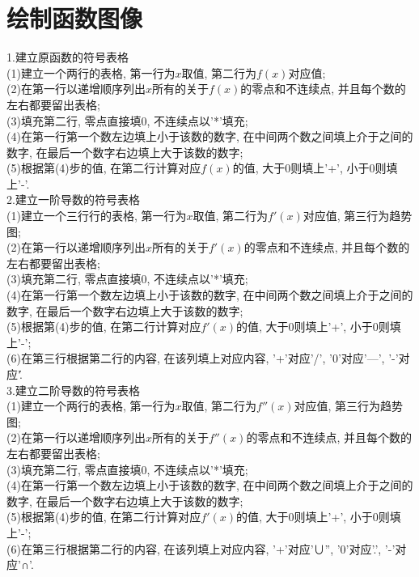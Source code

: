 \chapter{绘制函数图像}
1.建立原函数的符号表格\\
(1)建立一个两行的表格, 第一行为$x$取值, 第二行为$f(x)$对应值;\\
(2)在第一行以递增顺序列出$x$所有的关于$f(x)$的零点和不连续点, 并且每个数的左右都要留出表格;\\
(3)填充第二行, 零点直接填0, 不连续点以'*'填充;\\
(4)在第一行第一个数左边填上小于该数的数字, 在中间两个数之间填上介于之间的数字, 在最后一个数字右边填上大于该数的数字;\\
(5)根据第(4)步的值, 在第二行计算对应$f(x)$的值, 大于0则填上'+', 小于0则填上'-'.\\[2ex]

2.建立一阶导数的符号表格\\
(1)建立一个三行行的表格, 第一行为$x$取值, 第二行为$f'(x)$对应值, 第三行为趋势图;\\
(2)在第一行以递增顺序列出$x$所有的关于$f'(x)$的零点和不连续点, 并且每个数的左右都要留出表格;\\
(3)填充第二行, 零点直接填0, 不连续点以'*'填充;\\
(4)在第一行第一个数左边填上小于该数的数字, 在中间两个数之间填上介于之间的数字, 在最后一个数字右边填上大于该数的数字;\\
(5)根据第(4)步的值, 在第二行计算对应$f'(x)$的值, 大于0则填上'+', 小于0则填上'-';\\
(6)在第三行根据第二行的内容, 在该列填上对应内容, '+'对应'/', '0'对应'—', '-'对应'\'.\\[2ex]

3.建立二阶导数的符号表格\\
(1)建立一个两行的表格, 第一行为$x$取值, 第二行为$f''(x)$对应值, 第三行为趋势图;\\
(2)在第一行以递增顺序列出$x$所有的关于$f''(x)$的零点和不连续点, 并且每个数的左右都要留出表格;\\
(3)填充第二行, 零点直接填0, 不连续点以'*'填充;\\
(4)在第一行第一个数左边填上小于该数的数字, 在中间两个数之间填上介于之间的数字, 在最后一个数字右边填上大于该数的数字;\\
(5)根据第(4)步的值, 在第二行计算对应$f'(x)$的值, 大于0则填上'+', 小于0则填上'-';\\
(6)在第三行根据第二行的内容, 在该列填上对应内容, '+'对应'∪'', '0'对应'.', '-'对应'∩'.\\[2ex]

